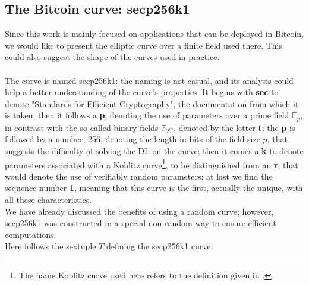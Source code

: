 \subsection{The Bitcoin curve: secp256k1}
\label{btccurve}
Since this work is mainly focused on applications that can be deployed in Bitcoin, we would like to present the elliptic curve over a finite field used there. This could also suggest the shape of the curves used in practice.
\\
\\
The curve is named secp256k1: the naming is not casual, and its analysis could help a better understanding of the curve's properties. It begins with {\bf sec} to denote "Standards for Efficient Cryptography", the documentation from which it is taken; then it follows a {\bf p}, denoting the use of parameters over a prime field $\mathbb{F}_p$, in contrast with the so called binary fields $\mathbb{F}_{2^m}$, denoted by the letter {\bf t}; the {\bf p} is followed by a number, 256, denoting the length in bits of the field size $p$, that suggests the difficulty of solving the DL on the curve; then it comes a {\bf k} to denote parameters associated with a Koblitz curve\footnote{The name Koblitz curve used here refers to the definition given in \cite{RefWork:3}.}, to be distinguished from an {\bf r}, that would denote the use of verifiably random parameters; at last we find the sequence number {\bf 1}, meaning that this curve is the first, actually the unique, with all these characteristics.
\\
We have already discussed the benefits of using a random curve; however, secp256k1 was constructed in a special non random way to ensure efficient computations.
\\
Here follows the sextuple $T$ defining the secp256k1 curve:
